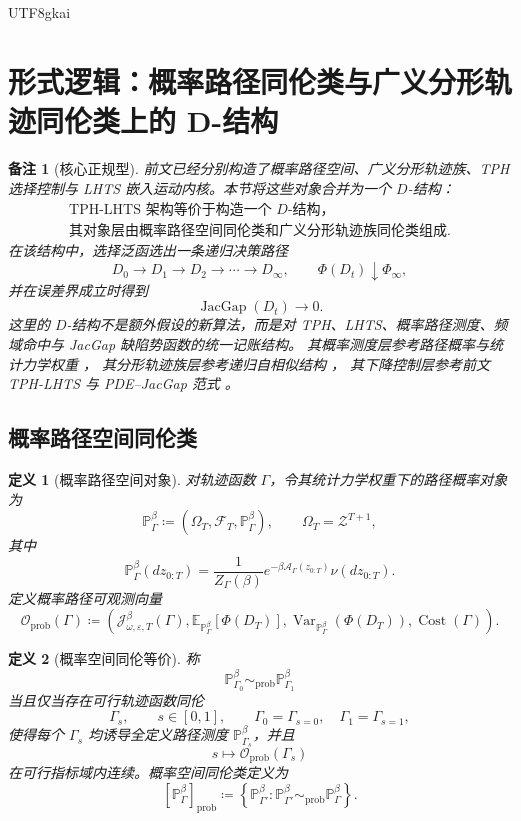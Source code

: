 \documentclass[12pt]{article}
\newtheorem{definition}{定义}[section]
\newtheorem{remark}{备注}[section]
\newcommand{\DefEq}{\coloneqq}
\newcommand{\Prob}{\mathbb P}
\newcommand{\E}{\mathbb E}
\DeclareMathOperator{\Cost}{Cost}
\DeclareMathOperator{\JacGap}{JacGap}
\DeclareMathOperator{\Var}{Var}
\begin{document}
\begin{CJK*}{UTF8}{gkai}
\section{形式逻辑：概率路径同伦类与广义分形轨迹同伦类上的 D-结构}
\label{sec:d-structure-prob-fractal-homotopy}

\begin{remark}[核心正规型]
前文已经分别构造了概率路径空间、广义分形轨迹族、TPH 选择控制与 LHTS
嵌入运动内核。本节将这些对象合并为一个 \(D\)-结构：
\[
\boxed{
\begin{gathered}
\text{TPH-LHTS 架构等价于构造一个 }D\text{-结构，}
\\
\text{其对象层由概率路径空间同伦类和广义分形轨迹族同伦类组成}.
\end{gathered}
}
\]
在该结构中，选择泛函选出一条递归决策路径
\[
\boxed{
D_0\to D_1\to D_2\to\cdots\to D_\infty,
\qquad
\Phi(D_t)\downarrow\Phi_\infty,
}
\]
并在误差界成立时得到
\[
\boxed{
\JacGap(D_t)\to0.
}
\]
这里的 \(D\)-结构不是额外假设的新算法，而是对
TPH、LHTS、概率路径测度、频域命中与 JacGap 缺陷势函数的统一记账结构。
其概率测度层参考路径概率与统计力学权重
\cite{Billingsley1995Probability,Touchette2009LargeDeviations}，
其分形轨迹族层参考递归自相似结构
\cite{Hutchinson1981Fractals,Barnsley1988Fractals}，
其下降控制层参考前文 TPH-LHTS 与 PDE--JacGap 范式
\cite{RepoTex56LHTS,RepoTex55PDEParadigm}。
\end{remark}

\subsection{概率路径空间同伦类}
\label{subsec:probability-path-homotopy-class}

\begin{definition}[概率路径空间对象]
对轨迹函数 \(\Gamma\)，令其统计力学权重下的路径概率对象为
\[
\mathbb P_\Gamma^\beta
\DefEq
(\Omega_T,\mathscr F_T,\Prob_\Gamma^\beta),
\qquad
\Omega_T=\mathcal Z^{T+1},
\]
其中
\[
\Prob_\Gamma^\beta(dz_{0:T})
=
\frac{1}{Z_\Gamma(\beta)}
e^{-\beta\mathcal A_\Gamma(z_{0:T})}
\nu(dz_{0:T}).
\]
定义概率路径可观测向量
\[
\mathcal O_{\mathrm{prob}}(\Gamma)
\DefEq
\left(
\mathcal J_{\omega,\varepsilon,T}^{\beta}(\Gamma),
\E_{\Prob_\Gamma^\beta}[\Phi(D_T)],
\Var_{\Prob_\Gamma^\beta}(\Phi(D_T)),
\Cost(\Gamma)
\right).
\]
\end{definition}

\begin{definition}[概率空间同伦等价]
称
\[
\mathbb P_{\Gamma_0}^\beta
\sim_{\mathrm{prob}}
\mathbb P_{\Gamma_1}^\beta
\]
当且仅当存在可行轨迹函数同伦
\[
\Gamma_s,\qquad s\in[0,1],
\qquad
\Gamma_0=\Gamma_{s=0},\quad
\Gamma_1=\Gamma_{s=1},
\]
使得每个 \(\Gamma_s\) 均诱导全定义路径测度
\(\Prob_{\Gamma_s}^{\beta}\)，并且
\[
s\longmapsto \mathcal O_{\mathrm{prob}}(\Gamma_s)
\]
在可行指标域内连续。概率空间同伦类定义为
\[
\boxed{
[\mathbb P_\Gamma^\beta]_{\mathrm{prob}}
\DefEq
\left\{
\mathbb P_{\Gamma'}^\beta:
\mathbb P_{\Gamma'}^\beta\sim_{\mathrm{prob}}\mathbb P_\Gamma^\beta
\right\}.
}
\]
\end{definition}


\end{CJK*}
\end{document}
